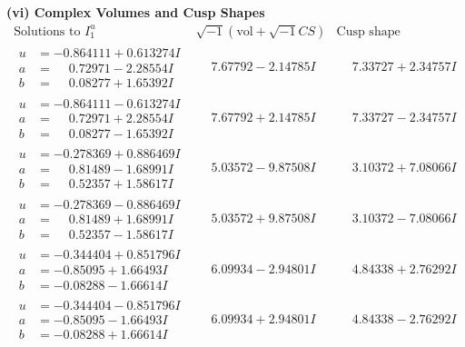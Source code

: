 \documentclass[1p]{elsarticle_modified}
\theoremstyle{definition}
\newcommand{\I}{\sqrt{-1}}
\begin{document}
\newpage\flushleft \textbf{(vi) Complex Volumes and Cusp Shapes}
$$\begin{array}{c|c|c}  
\text{Solutions to }I^u_{1}& \I (\text{vol} + \sqrt{-1}CS) & \text{Cusp shape}\\
 \hline 
\begin{aligned}
u &= -0.864111 + 0.613274 I \\
a &= \phantom{-}0.72971 - 2.28554 I \\
b &= \phantom{-}0.08277 + 1.65392 I\end{aligned}
 & \phantom{-}7.67792 - 2.14785 I & \phantom{-}7.33727 + 2.34757 I \\ \hline\begin{aligned}
u &= -0.864111 - 0.613274 I \\
a &= \phantom{-}0.72971 + 2.28554 I \\
b &= \phantom{-}0.08277 - 1.65392 I\end{aligned}
 & \phantom{-}7.67792 + 2.14785 I & \phantom{-}7.33727 - 2.34757 I \\ \hline\begin{aligned}
u &= -0.278369 + 0.886469 I \\
a &= \phantom{-}0.81489 - 1.68991 I \\
b &= \phantom{-}0.52357 + 1.58617 I\end{aligned}
 & \phantom{-}5.03572 - 9.87508 I & \phantom{-}3.10372 + 7.08066 I \\ \hline\begin{aligned}
u &= -0.278369 - 0.886469 I \\
a &= \phantom{-}0.81489 + 1.68991 I \\
b &= \phantom{-}0.52357 - 1.58617 I\end{aligned}
 & \phantom{-}5.03572 + 9.87508 I & \phantom{-}3.10372 - 7.08066 I \\ \hline\begin{aligned}
u &= -0.344404 + 0.851796 I \\
a &= -0.85095 + 1.66493 I \\
b &= -0.08288 - 1.66614 I\end{aligned}
 & \phantom{-}6.09934 - 2.94801 I & \phantom{-}4.84338 + 2.76292 I \\ \hline\begin{aligned}
u &= -0.344404 - 0.851796 I \\
a &= -0.85095 - 1.66493 I \\
b &= -0.08288 + 1.66614 I\end{aligned}
 & \phantom{-}6.09934 + 2.94801 I & \phantom{-}4.84338 - 2.76292 I \\ \hline\begin{aligned}

\end{aligned}
\end{array}$$
\end{document}
